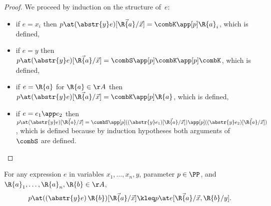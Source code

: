 \begin{proof}
  We proceed by induction on the structure of~$e$:
  \begin{itemize}
  \item if $e = x_i$ then $p \at (\abstr{y} e)[\vec{\R{a}}/\vec{x}] = \combK \app[p] \R{a}_i$, which is defined,
  \item if $e = y$ then $p \at (\abstr{y} e)[\vec{\R{a}}/\vec{x}] = \combS \app[p] \combK \app[p] \combK$, which is defined,
  \item if $e = \R{a}$ for $\R{a} \in \AA$ then $p \at (\abstr{y} e)[\vec{\R{a}}/\vec{x}] = \combK \app[p] \R{a}$, which is defined,
  \item if $e = e_1 \app e_2$ then
    $
    p \at (\abstr{y} e)[\vec{\R{a}}/\vec{x}] =
    \combS \app[p] ((\abstr{y} e_1)[\vec{\R{a}}/\vec{x}]) \app[p] ((\abstr{y} e_2)[\vec{\R{a}}/\vec{x}])
    $,
    which is defined because by induction hypotheses both arguments of~$\combS$ are defined.
    \qedhere
  \end{itemize}
\end{proof}

\begin{lemma}
  \label{lem:abstr-compute}%
  For any expression $e$ in variables $x_1, \ldots, x_n, y$, parameter $p \in \PP$, and $\R{a}_1, \ldots, \R{a}_n, \R{b} \in \AA$, 
  \begin{equation*}
    p \at ((\abstr{y} e) \, \R{b})[\vec{\R{a}}/\vec{x}] \kleq p \at e[\vec{\R{a}}/\vec{x}, \R{b}/y].
  \end{equation*}
\end{lemma}

